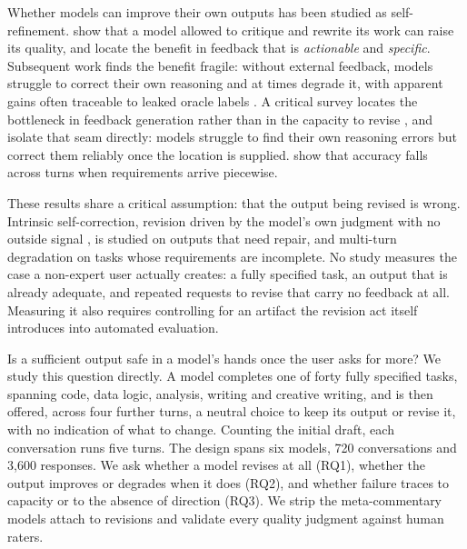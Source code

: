 Whether models can improve their own outputs has been studied as self-refinement.
\citet{madaan2024self} show that a model allowed to critique and rewrite its work can raise
its quality, and locate the benefit in feedback that is \emph{actionable} and
\emph{specific}. Subsequent work finds the benefit fragile: without external feedback,
models struggle to correct their own reasoning and at times degrade it, with apparent gains
often traceable to leaked oracle labels \cite{huang2024large}. A critical survey locates
the bottleneck in feedback generation rather than in the capacity to revise
\cite{kamoi2024selfcorrection}, and \citet{tyen2024llms} isolate that seam directly: models
struggle to find their own reasoning errors but correct them reliably once the location is
supplied. \citet{laban2025lost} show that accuracy falls across turns when requirements
arrive piecewise.

These results share a critical assumption: that the output being revised is wrong.
Intrinsic self-correction, revision driven by the model's own judgment with no outside
signal \cite{huang2024large, kamoi2024selfcorrection}, is studied on outputs that need
repair, and multi-turn degradation on tasks whose requirements are incomplete. No study
measures the case a non-expert user actually creates: a fully specified task, an output
that is already adequate, and repeated requests to revise that carry no feedback at all.
Measuring it also requires controlling for an artifact the revision act itself introduces
into automated evaluation.

Is a sufficient output safe in a model's hands once the user asks for more? We study this
question directly. A model completes one of forty fully specified tasks, spanning code,
data logic, analysis, writing and creative writing, and is then offered, across four
further turns, a neutral choice to keep its output or revise it, with no indication of what
to change. Counting the initial draft, each conversation runs five turns. The design spans
six models, 720 conversations and 3,600 responses. We ask whether a model revises at all
(RQ1), whether the output improves or degrades when it does (RQ2), and whether failure
traces to capacity or to the absence of direction (RQ3). We strip the meta-commentary
models attach to revisions and validate every quality judgment against human raters.

